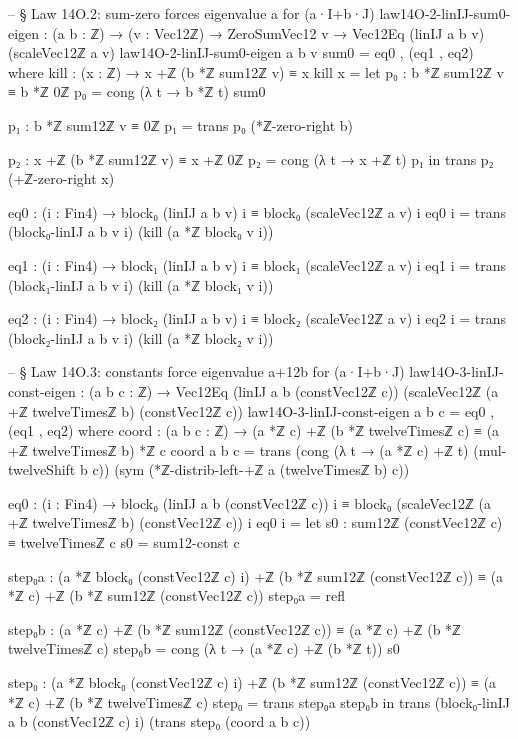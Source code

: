 \documentclass[11pt,a4paper]{book}
\begin{document}
\begin{code}
-- § Law 14O.2: sum-zero forces eigenvalue a for (a·I+b·J)
law14O-2-linIJ-sum0-eigen : (a b : ℤ) → (v : Vec12ℤ) → ZeroSumVec12 v → Vec12Eq (linIJ a b v) (scaleVec12ℤ a v)
law14O-2-linIJ-sum0-eigen a b v sum0 = eq0 , (eq1 , eq2)
  where
    kill : (x : ℤ) → x +ℤ (b *ℤ sum12ℤ v) ≡ x
    kill x =
      let
        p₀ : b *ℤ sum12ℤ v ≡ b *ℤ 0ℤ
        p₀ = cong (λ t → b *ℤ t) sum0

        p₁ : b *ℤ sum12ℤ v ≡ 0ℤ
        p₁ = trans p₀ (*ℤ-zero-right b)

        p₂ : x +ℤ (b *ℤ sum12ℤ v) ≡ x +ℤ 0ℤ
        p₂ = cong (λ t → x +ℤ t) p₁
      in
      trans p₂ (+ℤ-zero-right x)

    eq0 : (i : Fin4) → block₀ (linIJ a b v) i ≡ block₀ (scaleVec12ℤ a v) i
    eq0 i =
      trans
        (block₀-linIJ a b v i)
        (kill (a *ℤ block₀ v i))

    eq1 : (i : Fin4) → block₁ (linIJ a b v) i ≡ block₁ (scaleVec12ℤ a v) i
    eq1 i =
      trans
        (block₁-linIJ a b v i)
        (kill (a *ℤ block₁ v i))

    eq2 : (i : Fin4) → block₂ (linIJ a b v) i ≡ block₂ (scaleVec12ℤ a v) i
    eq2 i =
      trans
        (block₂-linIJ a b v i)
        (kill (a *ℤ block₂ v i))

-- § Law 14O.3: constants force eigenvalue a+12b for (a·I+b·J)
law14O-3-linIJ-const-eigen : (a b c : ℤ) →
  Vec12Eq (linIJ a b (constVec12ℤ c)) (scaleVec12ℤ (a +ℤ twelveTimesℤ b) (constVec12ℤ c))
law14O-3-linIJ-const-eigen a b c = eq0 , (eq1 , eq2)
  where
    coord : (a b c : ℤ) → (a *ℤ c) +ℤ (b *ℤ twelveTimesℤ c) ≡ (a +ℤ twelveTimesℤ b) *ℤ c
    coord a b c =
      trans
        (cong (λ t → (a *ℤ c) +ℤ t) (mul-twelveShift b c))
        (sym (*ℤ-distrib-left-+ℤ a (twelveTimesℤ b) c))

    eq0 : (i : Fin4) →
      block₀ (linIJ a b (constVec12ℤ c)) i ≡ block₀ (scaleVec12ℤ (a +ℤ twelveTimesℤ b) (constVec12ℤ c)) i
    eq0 i =
      let
        s0 : sum12ℤ (constVec12ℤ c) ≡ twelveTimesℤ c
        s0 = sum12-const c

        step₀a : (a *ℤ block₀ (constVec12ℤ c) i) +ℤ (b *ℤ sum12ℤ (constVec12ℤ c))
          ≡ (a *ℤ c) +ℤ (b *ℤ sum12ℤ (constVec12ℤ c))
        step₀a = refl

        step₀b : (a *ℤ c) +ℤ (b *ℤ sum12ℤ (constVec12ℤ c))
          ≡ (a *ℤ c) +ℤ (b *ℤ twelveTimesℤ c)
        step₀b = cong (λ t → (a *ℤ c) +ℤ (b *ℤ t)) s0

        step₀ : (a *ℤ block₀ (constVec12ℤ c) i) +ℤ (b *ℤ sum12ℤ (constVec12ℤ c))
          ≡ (a *ℤ c) +ℤ (b *ℤ twelveTimesℤ c)
        step₀ = trans step₀a step₀b
      in
      trans
        (block₀-linIJ a b (constVec12ℤ c) i)
        (trans step₀ (coord a b c))


\end{code}
\end{document}
